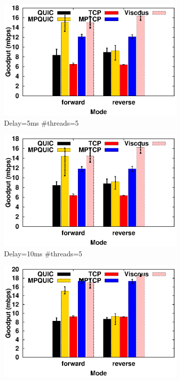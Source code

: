 \begin{figure}[h]
	\captionsetup[subfigure]{}
	\begin{center}
		\begin{subfigure}{.49\linewidth}
			\includegraphics[width=0.95\linewidth]{img/rocketfuel/goodPut-5-5.eps}
		 \caption{\label{fig:rocketfuel_goodput_5_20}Delay=5ms \#threads=5}
		\end{subfigure}
		\begin{subfigure}{.49\linewidth}
			\includegraphics[width=0.95\linewidth]{img/rocketfuel/goodPut-10-5.eps}
		 \caption{\label{fig:rocketfuel_goodput_10_5}Delay=10ms \#threads=5}
		\end{subfigure}
		\begin{subfigure}{.49\linewidth}
			\includegraphics[width=0.95\linewidth]{img/rocketfuel/goodPut-10-20.eps}

\end{subfigure}
\end{center}
\end{figure}
